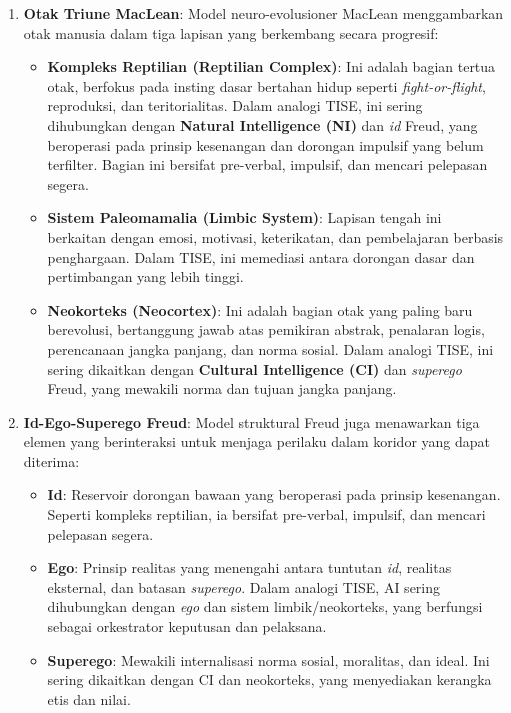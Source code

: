 \documentclass[
  letterpaper,
  DIV=11,
  numbers=noendperiod]{scrreprt}
\providecommand{\tightlist}{%
  \setlength{\itemsep}{0pt}\setlength{\parskip}{0pt}}
\begin{document}
\begin{enumerate}
\def\labelenumi{\arabic{enumi}.}
\tightlist
\item
  \textbf{Otak Triune MacLean}: Model neuro-evolusioner MacLean
  menggambarkan otak manusia dalam tiga lapisan yang berkembang secara
  progresif:

  \begin{itemize}
  \tightlist
  \item
    \textbf{Kompleks Reptilian (Reptilian Complex)}: Ini adalah bagian
    tertua otak, berfokus pada insting dasar bertahan hidup seperti
    \emph{fight-or-flight}, reproduksi, dan teritorialitas. Dalam
    analogi TISE, ini sering dihubungkan dengan \textbf{Natural
    Intelligence (NI)} dan \emph{id} Freud, yang beroperasi pada prinsip
    kesenangan dan dorongan impulsif yang belum terfilter. Bagian ini
    bersifat pre-verbal, impulsif, dan mencari pelepasan segera.
  \item
    \textbf{Sistem Paleomamalia (Limbic System)}: Lapisan tengah ini
    berkaitan dengan emosi, motivasi, keterikatan, dan pembelajaran
    berbasis penghargaan. Dalam TISE, ini memediasi antara dorongan
    dasar dan pertimbangan yang lebih tinggi.
  \item
    \textbf{Neokorteks (Neocortex)}: Ini adalah bagian otak yang paling
    baru berevolusi, bertanggung jawab atas pemikiran abstrak, penalaran
    logis, perencanaan jangka panjang, dan norma sosial. Dalam analogi
    TISE, ini sering dikaitkan dengan \textbf{Cultural Intelligence
    (CI)} dan \emph{superego} Freud, yang mewakili norma dan tujuan
    jangka panjang.
  \end{itemize}
\item
  \textbf{Id-Ego-Superego Freud}: Model struktural Freud juga menawarkan
  tiga elemen yang berinteraksi untuk menjaga perilaku dalam koridor
  yang dapat diterima:

  \begin{itemize}
  \tightlist
  \item
    \textbf{Id}: Reservoir dorongan bawaan yang beroperasi pada prinsip
    kesenangan. Seperti kompleks reptilian, ia bersifat pre-verbal,
    impulsif, dan mencari pelepasan segera.
  \item
    \textbf{Ego}: Prinsip realitas yang menengahi antara tuntutan
    \emph{id}, realitas eksternal, dan batasan \emph{superego}. Dalam
    analogi TISE, AI sering dihubungkan dengan \emph{ego} dan sistem
    limbik/neokorteks, yang berfungsi sebagai orkestrator keputusan dan
    pelaksana.
  \item
    \textbf{Superego}: Mewakili internalisasi norma sosial, moralitas,
    dan ideal. Ini sering dikaitkan dengan CI dan neokorteks, yang
    menyediakan kerangka etis dan nilai.
  \end{itemize}
\end{enumerate}
\end{document}
